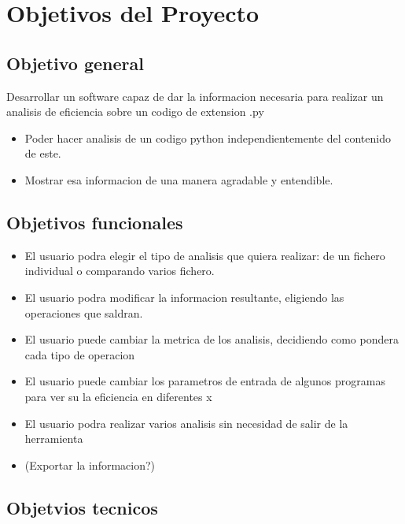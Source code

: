 
\section{Objetivos del Proyecto}

\subsection{Objetivo general}


Desarrollar un software capaz de dar la informacion necesaria para realizar un analisis de eficiencia sobre un codigo de extension .py
\begin{itemize}
	\item Poder hacer analisis de un codigo python independientemente del contenido de este.
	\item Mostrar esa informacion de una manera agradable y entendible.
\end{itemize}


\subsection{Objetivos funcionales}
	\begin{itemize}
	\item El usuario podra elegir el tipo de analisis que quiera realizar: de un fichero individual o comparando varios fichero.
	\item El usuario podra modificar la informacion resultante, eligiendo las operaciones que saldran.
	\item El usuario puede cambiar la metrica de los analisis, decidiendo como pondera cada tipo de operacion
	\item El usuario puede cambiar los parametros de entrada de algunos programas para ver su la eficiencia en diferentes x
	\item El usuario podra realizar varios analisis sin necesidad de salir de la herramienta
	\item(Exportar la informacion?)
\end{itemize}


\subsection{Objetvios tecnicos}

